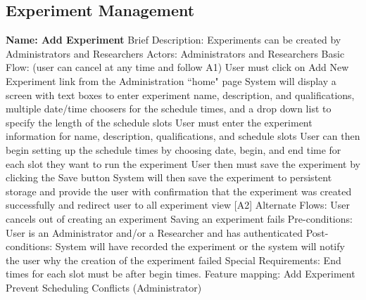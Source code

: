 \subsection{Experiment Management}
\begin{outline}[enumerate]
\1 {\bf Name: Add Experiment}
\2 Brief Description: Experiments can be created by Administrators and Researchers
\2 Actors: Administrators and Researchers
\2 Basic Flow: (user can cancel at any time and follow A1)
\3 User must click on Add New Experiment link from the Administration ``home" page
\3 System will display a screen with text boxes to enter experiment name, description,  and qualifications, multiple date/time choosers for the schedule times, and a drop down list to specify the length of the schedule slots
\3 User must enter the experiment information for name, description, qualifications, and schedule slots
\3 User can then begin setting up the schedule times by choosing date, begin, and end time for each slot they want to run the experiment
\3 User then must save the experiment by clicking the Save button
\3 System will then save the experiment to persistent storage and provide the user with confirmation that the experiment was created successfully and redirect user to all experiment view [A2]
\2 Alternate Flows:
\3 [A1] User cancels out of creating an experiment
\3 [A2] Saving an experiment fails
\2 Pre-conditions:
\3 User is an Administrator and/or a Researcher and has authenticated
\2 Post-conditions:
\3 System will have recorded the experiment or the system will notify the user why the creation of the experiment failed
\2 Special Requirements:
\3 End times for each slot must be after begin times.
\2 Feature mapping:
\3 Add Experiment
\3 Prevent Scheduling Conflicts (Administrator)


\end{outline}
